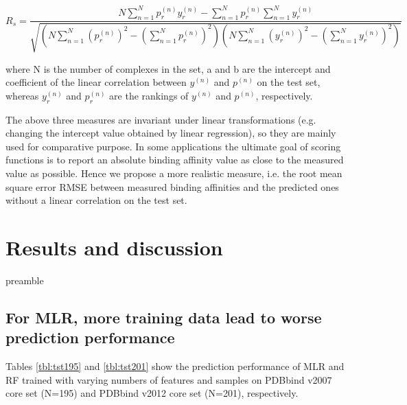 \documentclass[journal=jacsat,manuscript=article]{achemso}
\begin{document}
\begin{equation}
R_s = \frac{N\sum_{n=1}^Np_r^{(n)}y_r^{(n)}-\sum_{n=1}^Np_r^{(n)}\sum_{n=1}^Ny_r^{(n)}}{\sqrt{(N\sum_{n=1}^N(p_r^{(n)})^2-(\sum_{n=1}^Np_r^{(n)})^2)(N\sum_{n=1}^N(y_r^{(n)})^2-(\sum_{n=1}^Ny_r^{(n)})^2)}}
\label{eqn:rs}
\end{equation}

where N is the number of complexes in the set, a and b are the intercept and coefficient of the linear correlation between $y^{(n)}$ and $p^{(n)}$ on the test set, whereas $y_r^{(n)}$ and $p_r^{(n)}$ are the rankings of $y^{(n)}$ and $p^{(n)}$, respectively. 

The above three measures are invariant under linear transformations (e.g. changing the intercept value obtained by linear regression), so they are mainly used for comparative purpose. In some applications the ultimate goal of scoring functions is to report an absolute binding affinity value as close to the measured value as possible. Hence we propose a more realistic measure, i.e. the root mean square error RMSE between measured binding affinities and the predicted ones without a linear correlation on the test set.

\section{Results and discussion}

preamble

\subsection{For MLR, more training data lead to worse prediction performance}

Tables \ref{tbl:tst195} and \ref{tbl:tst201} show the prediction performance of MLR and RF trained with varying numbers of features and samples on PDBbind v2007 core set (N=195) and PDBbind v2012 core set (N=201), respectively.
\end{document}
